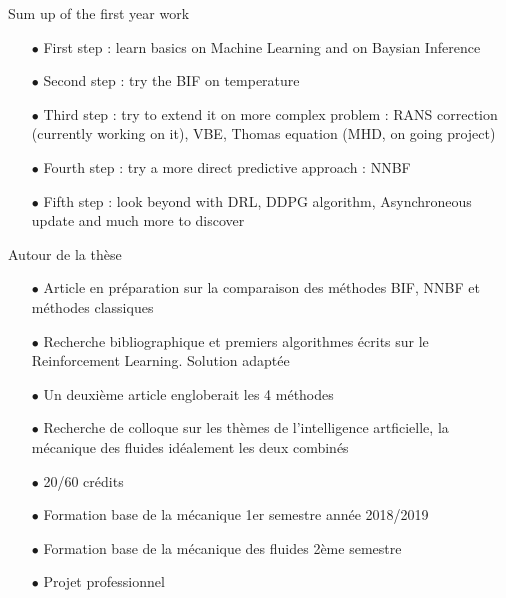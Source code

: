 \documentclass[10pt,
			   xcolor=svgnames,
			   hyperref={linkcolor=red, citecolor = DarkGreen, colorlinks=true, urlcolor=Navy}]{beamer}
\begin{document}
\begin{frame}{Sum up of the first year work}
	\begin{itemize}
		\item[$\bullet$] First step : learn basics on Machine Learning and on Baysian Inference \\[3mm]
		\item[$\bullet$] Second step : try the BIF on temperature\\[3mm]
		\item[$\bullet$] Third step : try to extend it on more complex problem : RANS correction (currently working on it), VBE, Thomas equation (MHD, on going project)\\[3mm]
		\item[$\bullet$] Fourth step : try a more direct predictive approach : NNBF  \\[3mm]
		\item[$\bullet$] Fifth step : look beyond with DRL, DDPG algorithm, Asynchroneous update and much more to discover
	\end{itemize}
\end{frame}

\begin{frame}{Autour de la thèse}
	\begin{itemize}
		\item[$\bullet$] Article en préparation sur la comparaison des méthodes BIF, NNBF et méthodes classiques \\[2mm]
		\item[$\bullet$] Recherche bibliographique et premiers algorithmes écrits sur le Reinforcement Learning. Solution adaptée \\[2mm]
		\item[$\bullet$] Un deuxième article engloberait les 4 méthodes
		\item[$\bullet$] Recherche de colloque sur les thèmes de l'intelligence artficielle, la mécanique des fluides idéalement les deux combinés \\[2mm]
		\item[$\bullet$] 20/60 crédits \\[2mm]
		\item[$\bullet$] Formation base de la mécanique 1er semestre année 2018/2019 \\[2mm]
		\item[$\bullet$] Formation base de la mécanique des fluides 2ème semestre \\[2mm]
		\item[$\bullet$] Projet professionnel
	\end{itemize}
\end{frame}
\end{document}
